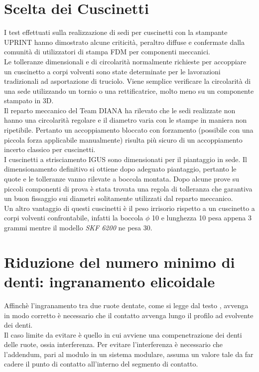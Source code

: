 \documentclass[%
corpo=11pt,
twoside,
 stile=classica,
oldstyle,
greek,%
]{toptesi}
\begin{document}
	\section{Scelta dei Cuscinetti}
	I test effettuati sulla realizzazione di sedi per cuscinetti con la stampante UPRINT hanno dimostrato alcune criticità, peraltro diffuse e confermate dalla comunità di utilizzatori di stampa FDM per componenti meccanici. \\
	Le tolleranze dimensionali e di circolarità normalmente richieste per accoppiare un cuscinetto a corpi volventi sono state determinate per le lavorazioni tradizionali ad asportazione di truciolo. Viene semplice verificare la circolarità di una sede utilizzando un tornio o una rettificatrice, molto meno su un componente stampato in 3D. \\
	Il reparto meccanico del Team DIANA ha rilevato che le sedi realizzate non hanno una circolarità regolare e il diametro varia con le stampe in maniera non ripetibile. Pertanto un accoppiamento bloccato con forzamento (possibile con una piccola forza applicabile manualmente) risulta più sicuro di un accoppiamento incerto classico per cuscinetti. \\
	I cuscinetti a strisciamento IGUS sono dimensionati per il piantaggio in sede. Il dimensionamento definitivo si ottiene dopo adeguato piantaggio, pertanto le quote e le tolleranze vanno rilevate a boccola montata.
	Dopo alcune prove su piccoli componenti di prova è stata trovata una regola di tolleranza che garantiva un buon fissaggio sui diametri solitamente utilizzati dal reparto meccanico. \\
	Un altro vantaggio di questi cuscinetti è il peso irrisorio rispetto a un cuscinetto a corpi volventi confrontabile, infatti la boccola $\phi$ 10 e lunghezza 10 pesa appena 3 grammi mentre il modello \textit{SKF 6200} ne pesa 30. 
	
	
	
	\section{Riduzione del numero minimo di denti: ingranamento elicoidale}\label{denti}
	Affinchè l'ingranamento tra due ruote dentate, come si legge dal testo \cite{Jacazioteo}, avvenga in modo corretto è necessario che il contatto avvenga lungo il profilo ad evolvente dei denti. \\
	Il caso limite da evitare è quello in cui avviene una compenetrazione dei denti delle ruote, ossia interferenza. Per evitare l'interferenza è necessario che l'addendum, pari al modulo in un sistema modulare, assuma un valore tale da far cadere il punto di contatto all'interno del segmento di contatto. \\
	
\end{document}
